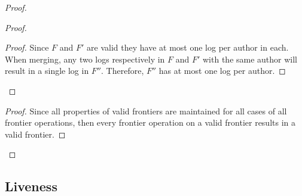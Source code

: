 \documentclass[9pt, oneside]{article}   	%
\begin{document}
\begin{proof}
\begin{proof}
		\begin{proof}
		Since $F$ and $F'$ are valid they have at most one log per author in each. When merging, any two logs respectively in $F$ and $F'$ with the same author will result in a single log in $F''$. Therefore, $F''$ has at most one log per author.
		\end{proof}
	\end{proof}
	
	\qedstep
	\begin{proof}
		Since all properties of valid frontiers are maintained for all cases of all frontier operations, then every frontier operation on a valid frontier results in a valid frontier.
	\end{proof}
\end{proof}

\subsection{Liveness}
\end{document}
